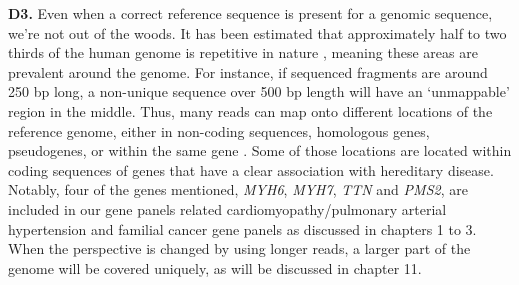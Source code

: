 \textbf{D3.} Even when a correct reference sequence is present for a genomic sequence, we’re not out of the woods. 
It has been estimated that approximately half to two thirds of the human genome is repetitive in nature \cite{de_Koning_2011}, meaning these areas are prevalent around the genome. 
For instance, if sequenced fragments are around 250 bp long, a non-unique sequence over 500 bp length will have an ‘unmappable’ region in the middle. 
Thus, many reads can map onto different locations of the reference genome, either in non-coding sequences, homologous genes, pseudogenes, or within the same gene \cite{Mandelker_2016}. 
Some of those locations are located within coding sequences of genes that have a clear association with hereditary disease. 
Notably, four of the genes mentioned, \textsl{MYH6}, \textsl{MYH7}, \textsl{TTN} and \textsl{PMS2}, are included in our gene panels related cardiomyopathy/pulmonary arterial hypertension and familial cancer gene panels as discussed in chapters 1 to 3. %
When the perspective is changed by using longer reads, a larger part of the genome will be covered uniquely, as will be discussed in chapter 11. 

